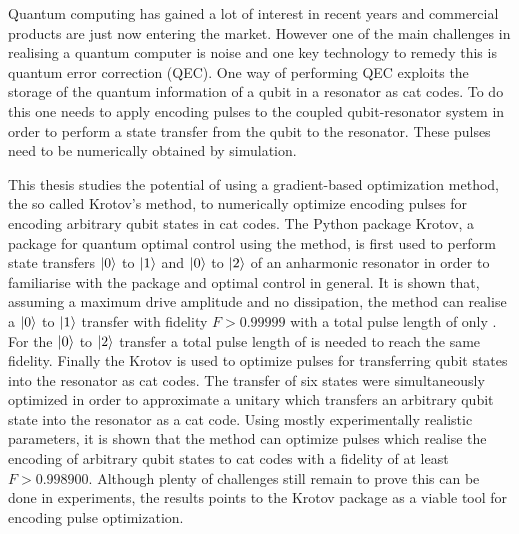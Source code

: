 \documentclass[main.tex]{subfiles}
\begin{document}
Quantum computing has gained a lot of interest in recent years and commercial products are just now entering the market.
However one of the main challenges in realising a quantum computer is noise and one key technology to remedy this is quantum error correction (QEC).
One way of performing QEC exploits the storage of the quantum information of a qubit in a resonator as cat codes.
To do this one needs to apply encoding pulses to the coupled qubit-resonator system in order to perform a state transfer from the qubit to the resonator.
These pulses need to be numerically obtained by simulation.

This thesis studies the potential of using a gradient-based optimization method, the so called Krotov's method, to numerically optimize encoding pulses for encoding arbitrary qubit states in cat codes.
The Python package Krotov, a package for quantum optimal control using the method, is first used to perform state transfers \(\ket{0}\) to \(\ket{1}\) and \(\ket{0}\) to \(\ket{2}\) of an anharmonic resonator in order to familiarise with the package and optimal control in general.
It is shown that, assuming a maximum drive amplitude and no dissipation, the method can realise a \(\ket{0}\) to \(\ket{1}\) transfer with fidelity \( F > 0.99999\) with a total pulse length of only .
For the \(\ket{0}\) to \(\ket{2}\) transfer a total pulse length of  is needed to reach the same fidelity.
Finally the Krotov is used to optimize pulses for transferring qubit states into the resonator as cat codes.
The transfer of six states were simultaneously optimized in order to approximate a unitary which transfers an arbitrary qubit state into the resonator as a cat code.
Using mostly experimentally realistic parameters, it is shown that the method can optimize pulses which realise the encoding of arbitrary qubit states to cat codes with a fidelity of at least \( F > 0.998900\).
Although plenty of challenges still remain to prove this can be done in experiments, the results points to the Krotov package as a viable tool for encoding pulse optimization.
\end{document}

